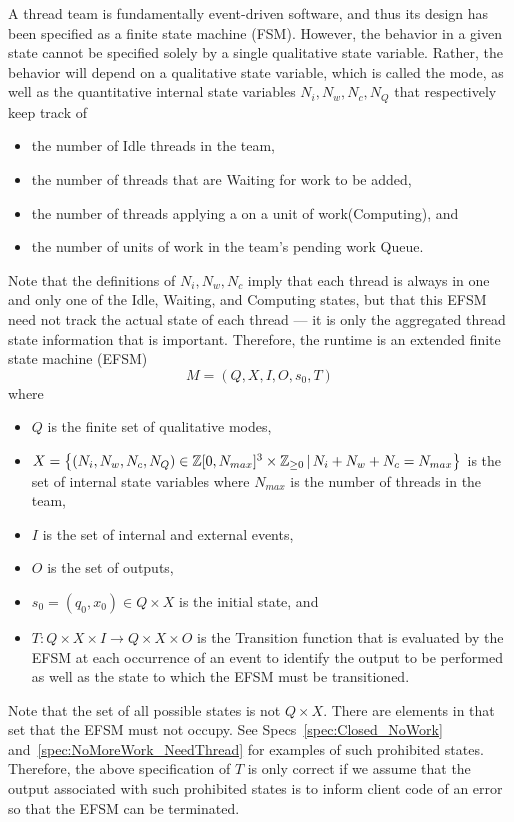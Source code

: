 \documentclass{article}
\begin{document}
A thread team is fundamentally event-driven software, and thus its design has
been specified as a finite state machine (FSM).  However, the behavior in a
given state cannot be specified solely by a single qualitative state variable.
Rather, the behavior will depend on a qualitative state variable, which is
called the mode, as well as the quantitative internal state variables $N_i, N_w,
N_c, N_Q$ that respectively keep track of
\begin{itemize}
\item{the number of Idle threads in the team,}
\item{the number of threads that are Waiting for work to be added,}
\item{the number of threads applying a \taskroutine on a unit of work(Computing), and}
\item{the number of units of work in the team's pending work Queue.}
\end{itemize}
Note that the definitions of $N_i, N_w, N_c$ imply that each thread is
always in one and only one of the Idle, Waiting, and Computing states, but that
this EFSM need not track the actual state of each thread --- it is only the
aggregated thread state information that is important.  Therefore, the runtime
is an extended finite state machine (EFSM)
\[
M = (Q, X, I, O, s_0, T)
\]
where
\begin{itemize}
\item{$Q$ is the finite set of qualitative modes,}
\item{$X = \set{(N_i, N_w, N_c, N_Q) \in {\mathbb Z}[0,N_{max}]^3\times{\mathbb Z}_{\ge 0}\,|\,N_i + N_w + N_c =
N_{max}}$ is the set of internal state variables where $N_{max}$ is the
number of threads in the team,}
\item{$I$ is the set of internal and external events,}
\item{$O$ is the set of outputs,}
\item{$s_0 = (q_0, x_0) \in Q \times X$ is the initial state, and}
\item{$T : Q \times X \times I \to Q \times X \times O$ is the Transition
function that is evaluated by the EFSM at each occurrence of an event to
identify the output to be performed as well as the state to which the EFSM must
be transitioned.}
\end{itemize}

Note that the set of all possible states is not $Q \times X$.  There are
elements in that set that the EFSM must not occupy.  See
Specs~\ref{spec:Closed_NoWork} and~\ref{spec:NoMoreWork_NeedThread} for examples
of such prohibited states.  Therefore, the above specification of $T$ is only
correct if we assume that the output associated with such prohibited states is
to inform client code of an error so that the EFSM can be terminated.\\
\end{document}
